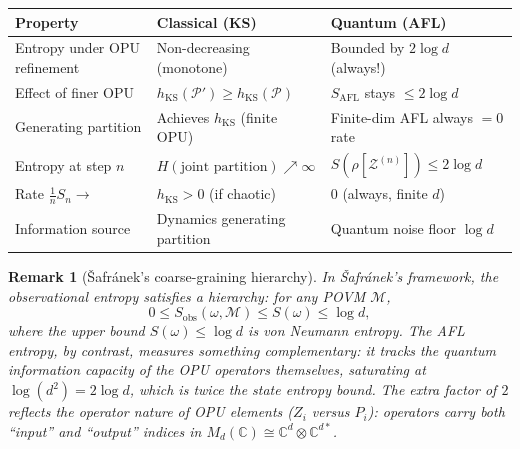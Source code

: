 \documentclass[12pt,a4paper]{article}
\newtheorem{remark}[theorem]{Remark}
\begin{document}
\begin{center}
\begin{tabular}{lll}
\hline
Property & Classical (KS) & Quantum (AFL) \\
\hline
Entropy under OPU refinement & Non-decreasing (monotone) & Bounded by $2\log d$ (always!) \\
Effect of finer OPU & $h_{\mathrm{KS}}(\mathcal{P}')\geq h_{\mathrm{KS}}(\mathcal{P})$ & $S_{\mathrm{AFL}}$ stays $\leq 2\log d$ \\
Generating partition & Achieves $h_{\mathrm{KS}}$ (finite OPU) & Finite-dim AFL always $=0$ rate \\
Entropy at step $n$ & $H(\text{joint partition}) \nearrow \infty$ & $S(\rho[\mathcal{Z}^{(n)}]) \leq 2\log d$ \\
Rate $\frac{1}{n}S_n \to$ & $h_{\mathrm{KS}} > 0$ (if chaotic) & $0$ (always, finite $d$) \\
Information source & Dynamics generating partition & Quantum noise floor $\log d$ \\
\hline
\end{tabular}
\end{center}

\begin{remark}[Šafránek's coarse-graining hierarchy]
In \v{S}afr\'anek's framework, the observational entropy satisfies a
\emph{hierarchy}: for any POVM $\mathcal{M}$,
\[
  0 \leq S_{\mathrm{obs}}(\omega,\mathcal{M})
  \leq S(\omega)
  \leq \log d,
\]
where the upper bound $S(\omega)\leq\log d$ is von Neumann entropy.
The AFL entropy, by contrast, measures something complementary:
it tracks the quantum information capacity of the OPU operators themselves,
saturating at $\log(d^2)=2\log d$, which is \emph{twice} the state entropy
bound.  The extra factor of $2$ reflects the operator nature of OPU elements
($Z_i$ versus $P_i$): operators carry both ``input'' and ``output'' indices in
$M_d(\mathbb{C})\cong\mathbb{C}^d\otimes\mathbb{C}^{d*}$.
\end{remark}
\end{document}
